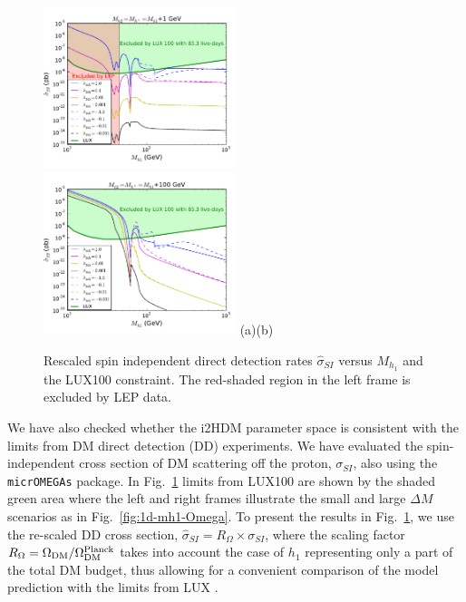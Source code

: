 \documentclass[12pt,a4paper]{article}
\begin{document}
 
\begin{figure}[htb]
\centering
{\includegraphics[width=0.5\textwidth]{DD_LUX_limit_new.pdf}}%
{\includegraphics[width=0.5\textwidth]{DD_LUX_limit_mh+100_new.pdf}}%
\vskip -0.5cm\hspace*{-3cm}(a)\hspace*{0.48\textwidth}(b)
\caption{Rescaled spin independent direct detection rates $\hat{\sigma}_{SI}$ versus $M_{h_1}$ and the LUX100 constraint.
 The red-shaded region in the left frame is excluded by LEP data.
\label{fig:1d-mh1-DD}}
\end{figure}



We have also checked whether the i2HDM parameter space is consistent with the limits from  DM direct detection (DD) experiments.
We have evaluated the spin-independent cross section of DM scattering off the proton, $\sigma_{SI}$,
 also using the \texttt{micrOMEGAs} package.
In Fig.~\ref{fig:1d-mh1-DD} limits from LUX100 are shown by the shaded green area where the left and right frames
illustrate the small and large $\Delta M$  scenarios as in Fig.~\ref{fig:1d-mh1-Omega}.
To present the results in Fig.~\ref{fig:1d-mh1-DD}, we use the re-scaled DD cross section, $\hat{\sigma}_{SI}= 
R_\Omega\times \sigma_{SI}$, where the scaling factor
$R_\Omega = \Omega_{\rm DM}/\Omega^{\rm Planck}_{\rm DM}$ takes into account the case of $h_1$
representing only a part of the total DM budget, thus allowing for a convenient comparison
of the model prediction with the limits from LUX \cite{Akerib:2013tjd}.
\end{document}
